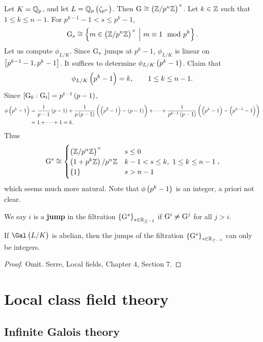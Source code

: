 \begin{example*}
Let $ K = \mathbb{Q}_p $, and let $ L = \QQ_p\br{\zeta_{p^n}} $. Then $ \G \cong \br{\ZZ / p^n\ZZ}^\times $. Let $ k \in \mathbb{Z} $ such that $ 1 \le k \le n - 1 $. For $ p^{k - 1} - 1 < s \le p^k - 1 $,
$$ \G_s \cong \cbr{m \in \br{\ZZ / p^n\ZZ}^\times \st m \equiv 1 \mod p^k}. $$
Let us compute $ \phi_{L / K} $. Since $ \mathrm{G}_s $ jumps at $ p^k - 1 $, $ \phi_{L / K} $ is linear on $ \sbr{p^{k - 1} - 1, p^k - 1} $. It suffices to determine $ \phi_{L / K}\br{p^k - 1} $. Claim that
$$ \phi_{L / K}\br{p^k - 1} = k, \qquad 1 \le k \le n - 1. $$
Since $ \sbr{\G_0 : \G_t} = p^{t - 1}\br{p - 1} $,
\begin{align*}
\phi\br{p^k - 1}
& = \dfrac{1}{p - 1}\br{p - 1} + \dfrac{1}{p\br{p - 1}}\br{\br{p^2 - 1} - \br{p - 1}} + \dots + \dfrac{1}{p^{k - 1}\br{p - 1}}\br{\br{p^k - 1} - \br{p^{k - 1} - 1}} \\
& = 1 + \dots + 1
= k.
\end{align*}
Thus
$$ \G^s \cong
\begin{cases}
\br{\ZZ / p^n\ZZ}^\times & s \le 0 \\
\br{1 + p^k\ZZ} / p^n\ZZ & k - 1 < s \le k, \ 1 \le k \le n - 1 \\
\cbr{1} & s > n - 1
\end{cases},
$$
which seems much more natural. Note that $ \phi\br{p^k - 1} $ is an integer, a priori not clear.
\end{example*}

\begin{definition}
We say $ i $ is a \textbf{jump} in the filtration $ \cbr{\G^s}_{s \in \RR_{\ge -1}} $ if $ \mathrm{G}^i \ne \mathrm{G}^j $ for all $ j > i $.
\end{definition}

\begin{theorem}
If $ \Gal\br{L / K} $ is abelian, then the jumps of the filtration $ \cbr{\G^s}_{s \in \RR_{\ge -1}} $ can only be integers.
\end{theorem}

\begin{proof}
Omit. Serre, Local fields, Chapter $ 4 $, Section $ 7 $.
\end{proof}

\pagebreak

\section{Local class field theory}

\subsection{Infinite Galois theory}

